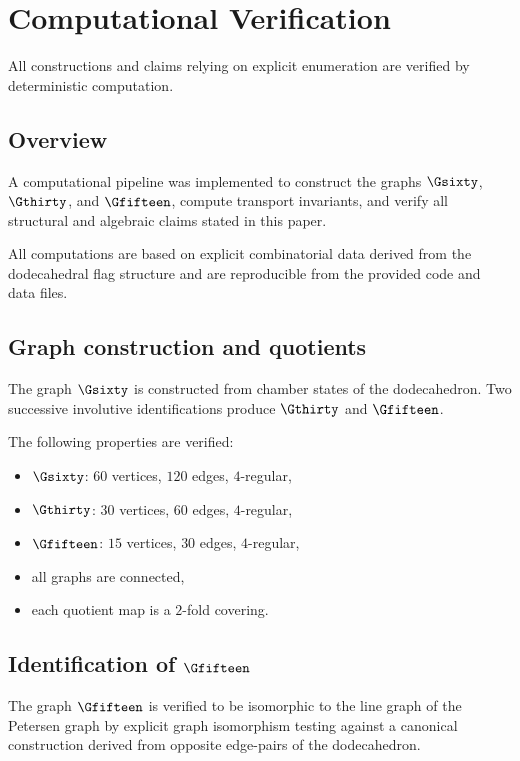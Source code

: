 \section{Computational Verification}

All constructions and claims relying on explicit enumeration are
verified by deterministic computation.

\subsection{Overview}

A computational pipeline was implemented to construct the graphs
$\Gsixty$, $\Gthirty$, and $\Gfifteen$, compute transport invariants,
and verify all structural and algebraic claims stated in this paper.

All computations are based on explicit combinatorial data derived from
the dodecahedral flag structure and are reproducible from the provided
code and data files.

\subsection{Graph construction and quotients}

The graph $\Gsixty$ is constructed from chamber states of the
dodecahedron. Two successive involutive identifications produce
$\Gthirty$ and $\Gfifteen$.

The following properties are verified:
\begin{itemize}
\item $\Gsixty$: $60$ vertices, $120$ edges, $4$-regular,
\item $\Gthirty$: $30$ vertices, $60$ edges, $4$-regular,
\item $\Gfifteen$: $15$ vertices, $30$ edges, $4$-regular,
\item all graphs are connected,
\item each quotient map is a $2$-fold covering.
\end{itemize}

\subsection{Identification of $\Gfifteen$}

The graph $\Gfifteen$ is verified to be isomorphic to the line graph of
the Petersen graph by explicit graph isomorphism testing against a
canonical construction derived from opposite edge-pairs of the
dodecahedron.

